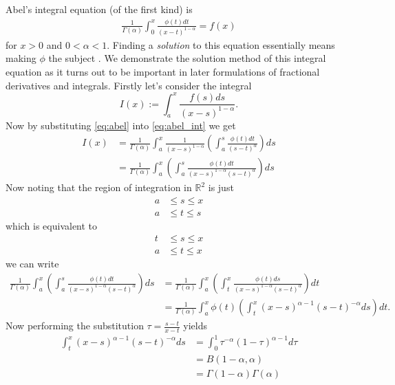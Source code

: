 Abel's integral equation (of the first kind) is 
\begin{align}
    \label{eq:abel}
    \frac{1}{\Gamma(\alpha)} \int_0^x \frac{\phi(t)dt}{(x-t)^{1-\alpha}} = f(x) 
\end{align}
for $ x > 0 $ and $ 0 < \alpha < 1 $. Finding a \emph{solution} to this equation essentially means making $ \phi $ the subject \cite{Samko1993}. 
We demonstrate the solution method of this integral equation as it turns out to be important in later formulations of fractional derivatives and integrals.
Firstly let's consider the integral 
\begin{equation}
	\label{eq:abel_int}
	I(x) := \int_a^x \frac{f(s)ds}{(x-s)^{1-\alpha}}.
\end{equation}
Now by substituting \eqref{eq:abel} into \eqref{eq:abel_int} we get 
\begin{align*}
	I(x) &= \frac{1}{\Gamma(\alpha)} \int_a^x \frac{1}{(x-s)^{1-\alpha}} \left( \int_a^s \frac{\phi(t)dt}{(s-t)^\alpha} \right) ds \\
		&= \frac{1}{\Gamma(\alpha)} \int_a^x \left( \int_a^s \frac{\phi(t)dt}{(x-s)^{1-\alpha}(s-t)^\alpha} \right) ds
\end{align*}
Now noting that the region of integration in $ \mathbb{R}^2 $ is just
\begin{align*}
	a &\leq s \leq x \\
	a &\leq t \leq s 
\end{align*}
which is equivalent to 
\begin{align*}
	t &\leq s \leq x \\
	a &\leq t \leq x 
\end{align*}
we can write 
\begin{align}
	\frac{1}{\Gamma(\alpha)} \int_a^x \left( \int_a^s \frac{\phi(t)dt}{(x-s)^{1-\alpha}(s-t)^\alpha} \right) ds 
		&= \frac{1}{\Gamma(\alpha)} \int_a^x \left( \int_t^x \frac{\phi(t)ds}{(x-s)^{1-\alpha}(s-t)^\alpha} \right) dt \nonumber \\
		\label{eqn:prebeta}
		&= \frac{1}{\Gamma(\alpha)} \int_a^x \phi(t) \left( \int_t^x (x-s)^{\alpha-1}(s-t)^{-\alpha} ds\right) dt. 
\end{align}
Now performing the substitution $ \tau = \frac{s-t}{x-t} $ yields 
\begin{align*}
	\int_t^x (x-s)^{\alpha-1}(s-t)^{-\alpha} ds &= \int_0^1 \tau^{-\alpha} (1-\tau)^{\alpha - 1} d\tau \\
		&= B(1-\alpha,\alpha) \\
		&= \Gamma(1-\alpha)\Gamma(\alpha)
\end{align*}
